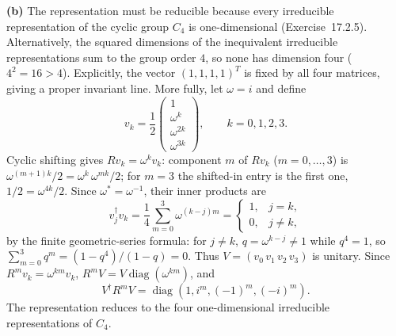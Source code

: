 \textbf{(b)} The representation must be reducible because every
irreducible representation of the cyclic group $C_4$ is
one-dimensional (Exercise~17.2.5). Alternatively, the squared
dimensions of the inequivalent irreducible representations sum to the
group order $4$, so none has dimension four ($4^2=16>4$).
Explicitly, the vector $(1,1,1,1)^T$ is fixed by all
four matrices, giving a proper invariant line.
More fully, let $\omega=i$ and define
\[
v_k=\frac12\begin{pmatrix}1\\\omega^k\\\omega^{2k}\\
\omega^{3k}\end{pmatrix},\qquad k=0,1,2,3.
\]
Cyclic shifting gives $Rv_k=\omega^kv_k$: component $m$ of
$Rv_k$ ($m=0,\ldots,3$) is
$\omega^{(m+1)k}/2=\omega^k\,\omega^{mk}/2$; for $m=3$ the
shifted-in entry is the first one, $1/2=\omega^{4k}/2$.
Since $\omega^*=\omega^{-1}$, their inner products are
\[
v_j^\dagger v_k=\frac14\sum_{m=0}^3\omega^{(k-j)m}
=\begin{cases}1,&j=k,\\0,&j\ne k,\end{cases}
\]
by the finite geometric-series formula: for $j\ne k$,
$q=\omega^{k-j}\ne1$ while $q^4=1$, so
$\sum_{m=0}^3q^m=(1-q^4)/(1-q)=0$.
Thus $V=(v_0\,v_1\,v_2\,v_3)$ is unitary. Since
$R^mv_k=\omega^{km}v_k$, $R^mV=V\operatorname{diag}(\omega^{km})$, and
\[
\boxed{V^\dagger R^mV=\operatorname{diag}(1,i^m,(-1)^m,(-i)^m)}.
\]
The representation reduces to the four one-dimensional irreducible
representations of $C_4$.

